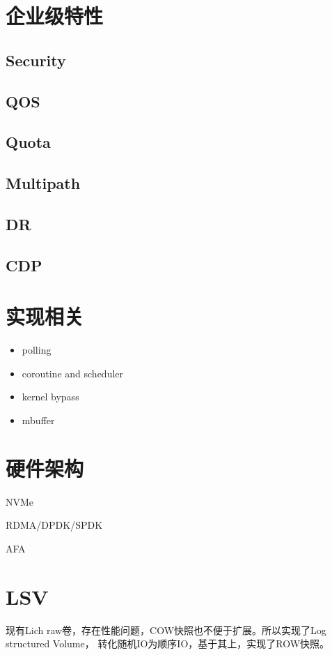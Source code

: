 \documentclass[UTF8]{ctexart}
\begin{document}
\section{企业级特性}

\subsection{Security}
\subsection{QOS}
\subsection{Quota}
\subsection{Multipath}
\subsection{DR}
\subsection{CDP}

\section{实现相关}

\begin{itemize}
    \item polling
    \item coroutine and scheduler
    \item kernel bypass
    \item mbuffer
\end{itemize}

\section{硬件架构}

NVMe

RDMA/DPDK/SPDK

AFA


\section{LSV}

现有Lich raw卷，存在性能问题，COW快照也不便于扩展。所以实现了Log structured Volume，
转化随机IO为顺序IO，基于其上，实现了ROW快照。
\end{document}
